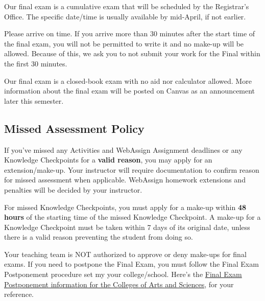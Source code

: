 \documentclass[12pt]{article}
\begin{document}
        Our final exam is a cumulative exam that will be scheduled by the Registrar's Office. The specific date/time is usually available by mid-April, if not earlier. 

        Please arrive on time. If you arrive more than 30 minutes after the start time of the final exam, you will not be permitted to write it and no make-up will be allowed. Because of this, we ask you to not submit your work for the Final within the first 30 minutes.
        
        Our final exam is a closed-book exam with no aid nor calculator allowed. More information about the final exam will be posted on Canvas as an announcement later this semester.

        \subsection{Missed Assessment Policy}

        If you've missed any Activities and WebAssign Assignment deadlines or any Knowledge Checkpoints for a \textbf{valid reason}, you may apply for an extension/make-up. Your instructor will require documentation to confirm reason for missed assessment when applicable. WebAssign homework extensions and penalties will be decided by your instructor.

        

        For missed Knowledge Checkpoints, you must apply for a make-up within \textbf{48 hours} of the starting time of the missed Knowledge Checkpoint. A make-up for a Knowledge Checkpoint must be taken within 7 days of its original date, unless there is a valid reason preventing the student from doing so.

        Your teaching team is NOT authorized to approve or deny make-ups for final exams. If you need to postpone the Final Exam, you must follow the Final Exam Postponement procedure set my your college/school. Here's the \href{https://college.as.virginia.edu/final-exam-postponement-form-and-instructions}{Final Exam Postponement information for the Colleges of Arts and Sciences}, for your reference.
\end{document}
